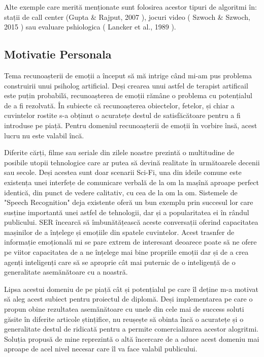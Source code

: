 \documentclass[a4paper,12pt]{book}
\begin{document}
					Alte exemple care merită menționate sunt folosirea acestor tipuri de algoritmi în: stații de call center (Gupta \& Rajput, 2007 \cite{gupta}), jocuri video ( Szwoch \& Szwoch, 2015 \cite{szwoch}) sau evaluare pshiologica ( Lancker et al., 1989 \cite{lancker} ). \par 							
			\subsection{Motivatie Personala}				
					Tema recunoașterii de emoții a început să mă intrige când mi-am pus problema construirii unui psiholog artificial. Deși crearea unui astfel de terapist artificail este puțin probabilă, recunoașterea de emoții rămâne o problema cu potențialul de a fi rezolvată. În subiecte că recunoașterea obiectelor, fetelor, și chiar a cuvintelor rostite s-a obținut o acuratețe destul de satisfăcătoare pentru a fi introduse pe piață. Pentru domeniul recunoașterii de emoții în vorbire însă, acest lucru nu este valabil încă. \par
					
					Diferite cărți, filme sau seriale din zilele noastre prezintă o multitudine de posibile utopii tehnologice care ar putea să devină realitate în următoarele decenii sau secole. Deși acestea sunt doar scenarii Sci-Fi, una din ideile comune este existența unei interfețe de comunicare verbală de la om la mașînă aproape perfect identică, din punct de vedere calitativ, cu cea de la om la om. Sistemele de "Speech Recognition" deja existente oferă un bun exemplu prin succesul lor care susține importantă unei astfel de tehnologii, dar și a popularitatea ei în rândul publicului. SER încearcă să îmbunătățească aceste conversații oferind capacitatea mașinilor de a înțelege și emoțiile din spatele cuvintelor. Acest trasnfer de informație emoțională mi se pare extrem de interesant deoarece poate să ne ofere pe viitor capacitatea de a ne înțelege mai bine propriile emoții dar și de a crea agenți inteligenți care să se aproprie cât mai puternic de o inteligență de o generalitate asemănătoare cu a noastră. \par
					
					Lipsa acestui domeniu de pe piață cât și potențialul pe care îl deține m-a motivat să aleg acest subiect pentru proiectul de diplomă. Deși implementarea pe care o propun obine rezultatea asemănătoare cu unele din cele mai de success soluti găsite în diferite articole ștințifice, nu reușește să obinta încă o acuratețe și o  generalitate destul de ridicată pentru a permite comercializarea acestor alogritmi. Soluția propusă de mine reprezintă o altă încercare de a aduce acest domeniu mai aproape de acel nivel necesar care îl va face valabil publicului. \par  
										
\end{document}
